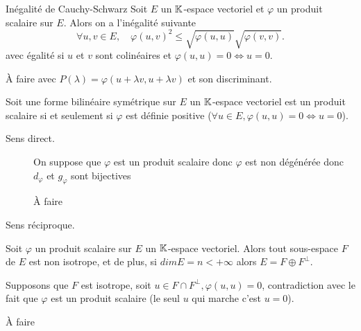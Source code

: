 \documentclass[a4paper, 12pt]{article}
\begin{document}
\begin{proposition}{Inégalité de Cauchy-Schwarz}{}
    Soit $E$ un $\mathbb{K}$-espace vectoriel et $\varphi$ un produit scalaire sur $E$.
    Alors on a l'inégalité suivante
    $$
    \forall u, v \in E, \quad \varphi(u, v)^2 \leq \sqrt{\varphi(u, u)} \sqrt{\varphi(v, v)}.
    $$
    avec égalité si $u$ et $v$ sont colinéaires et $\varphi(u, u) = 0 \iff u = 0$.
\end{proposition}

\begin{demonstration}
    \begin{hotwarn}
        À faire avec $P(\lambda) = \varphi(u + \lambda v, u + \lambda v)$ et son discriminant.
    \end{hotwarn}
\end{demonstration}

\begin{proposition}{}{}
    Soit une forme bilinéaire symétrique sur $E$ un $\mathbb{K}$-espace vectoriel est un produit scalaire
    si et seulement si $\varphi$ est définie positive ($\forall u \in E, \varphi(u, u) = 0 \iff u = 0$).
\end{proposition}

\begin{demonstration}
    \begin{description}
        \item[Sens direct.] On suppose que $\varphi$ est un produit scalaire donc $\varphi$ est non dégénérée donc $d_\varphi$ et $g_\varphi$ sont bijectives
        \begin{hotwarn}
            À faire
        \end{hotwarn}
        \item[Sens réciproque.]
    \end{description}
\end{demonstration}

\begin{proposition}{}{}
    Soit $\varphi$ un produit scalaire sur $E$ un $\mathbb{K}$-espace vectoriel.
    Alors tout sous-espace $F$ de $E$ est non isotrope, et de plus, si $dim E = n < +\infty$ alors $E = F \oplus F^\perp$.
\end{proposition}

\begin{demonstration}
    Supposons que $F$ est isotrope, soit $u \in F \cap F^\perp, \varphi(u, u) = 0$, contradiction
    avec le fait que $\varphi$ est un produit scalaire (le seul $u$ qui marche c'est $u = 0$).
    \begin{hotwarn}
        À faire
    \end{hotwarn}
\end{demonstration}
\end{document}
